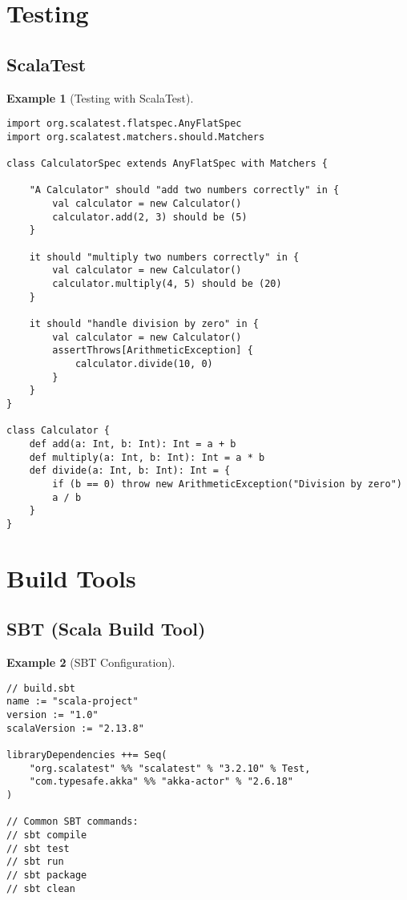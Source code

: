 \documentclass[11pt]{article}
\newtheorem{example}{Example}[section]
\begin{document}
\section{Testing}

\subsection{ScalaTest}

\begin{example}[Testing with ScalaTest]
\begin{lstlisting}
import org.scalatest.flatspec.AnyFlatSpec
import org.scalatest.matchers.should.Matchers

class CalculatorSpec extends AnyFlatSpec with Matchers {
    
    "A Calculator" should "add two numbers correctly" in {
        val calculator = new Calculator()
        calculator.add(2, 3) should be (5)
    }
    
    it should "multiply two numbers correctly" in {
        val calculator = new Calculator()
        calculator.multiply(4, 5) should be (20)
    }
    
    it should "handle division by zero" in {
        val calculator = new Calculator()
        assertThrows[ArithmeticException] {
            calculator.divide(10, 0)
        }
    }
}

class Calculator {
    def add(a: Int, b: Int): Int = a + b
    def multiply(a: Int, b: Int): Int = a * b
    def divide(a: Int, b: Int): Int = {
        if (b == 0) throw new ArithmeticException("Division by zero")
        a / b
    }
}
\end{lstlisting}
\end{example}

\section{Build Tools}

\subsection{SBT (Scala Build Tool)}

\begin{example}[SBT Configuration]
\begin{lstlisting}
// build.sbt
name := "scala-project"
version := "1.0"
scalaVersion := "2.13.8"

libraryDependencies ++= Seq(
    "org.scalatest" %% "scalatest" % "3.2.10" % Test,
    "com.typesafe.akka" %% "akka-actor" % "2.6.18"
)

// Common SBT commands:
// sbt compile
// sbt test
// sbt run
// sbt package
// sbt clean
\end{lstlisting}
\end{example}
\end{document}
